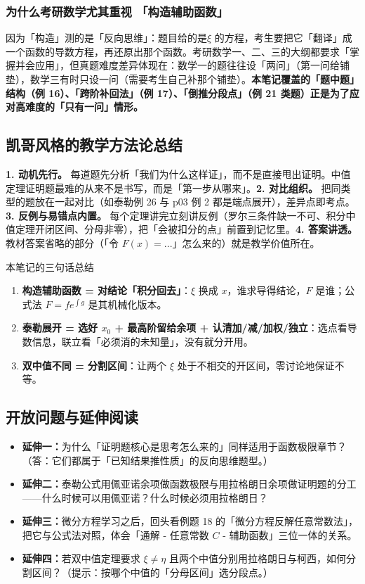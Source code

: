 \documentclass[a4paper]{article}
\begin{document}
\subsubsection{为什么考研数学尤其重视 「构造辅助函数」}

因为「构造」测的是「反向思维」：题目给的是$\xi$ 的方程，考生要把它「翻译」成一个函数的导数方程，再还原出那个函数。考研数学一、二、三的大纲都要求「掌握并会应用」，但真题难度差异体现在：数学一的题往往设「两问」（第一问给铺垫），数学三有时只设一问（需要考生自己补那个铺垫）。\textbf{本笔记覆盖的「题中题」结构（例 16）、「跨阶补回法」（例 17）、「倒推分段点」（例 21 类题）正是为了应对高难度的「只有一问」情形。}

\subsection{凯哥风格的教学方法论总结}

\textbf{1. 动机先行。} 每道题先分析「我们为什么这样证」，而不是直接甩出证明。中值定理证明题最难的从来不是书写，而是「第一步从哪来」。\textbf{2. 对比组织。} 把同类型的题放在一起对比（如泰勒例 26 与 p03 例 2 都是端点展开），差异点即考点。\textbf{3. 反例与易错点内置。} 每个定理讲完立刻讲反例（罗尔三条件缺一不可、积分中值定理开闭区间、分母非零），把「会被扣分的点」前置到记忆里。\textbf{4. 答案讲透。} 教材答案省略的部分（「令 $F(x)=...$」怎么来的）就是教学价值所在。

\begin{importantbox}{本笔记的三句话总结}
\begin{enumerate}
\item \textbf{构造辅助函数 = 对结论「积分回去」}：$\xi$ 换成 $x$，谁求导得结论，$F$ 是谁；公式法 $F=fe^{\int g}$ 是其机械化版本。
\item \textbf{泰勒展开 = 选好 $x_0$ + 最高阶留给余项 + 认清加/减/加权/独立}：选点看导数信息，联立看「必须消的未知量」，没有就分开用。
\item \textbf{双中值不同 = 分割区间}：让两个 $\xi$ 处于不相交的开区间，零讨论地保证不等。
\end{enumerate}
\end{importantbox}

\subsection{开放问题与延伸阅读}

\begin{itemize}
\item \textbf{延伸一：}为什么「证明题核心是思考怎么来的」同样适用于函数极限章节？（答：它们都属于「已知结果推性质」的反向思维题型。）
\item \textbf{延伸二：}泰勒公式用佩亚诺余项做函数极限与用拉格朗日余项做证明题的分工——什么时候可以用佩亚诺？什么时候必须用拉格朗日？
\item \textbf{延伸三：}微分方程学习之后，回头看例题 18 的「微分方程反解任意常数法」，把它与公式法对照，体会「通解 - 任意常数 $C$ - 辅助函数」三位一体的关系。
\item \textbf{延伸四：}若双中值定理要求 $\xi\neq\eta$ 且两个中值分别用拉格朗日与柯西，如何分割区间？（提示：按哪个中值的「分母区间」选分段点。）
\end{itemize}
\end{document}
